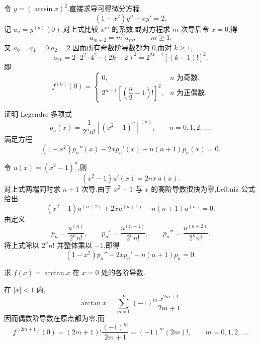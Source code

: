 \begin{solution}
    令 $y=(\arcsin x)^2$.直接求导可得微分方程
    \[
        (1-x^2)y''-xy'=2.
    \]
    记 $a_n=y^{(n)}(0)$.对上式比较 $x^m$ 的系数,或对方程求 $m$ 次导后令 $x=0$,得
    \[
        a_{m+2}=m^2a_m,
        \qquad m\geq1.
    \]
    又 $a_0=a_1=0$,$a_2=2$.因而所有奇数阶导数都为 $0$,而对 $k\geq1$,
    \[
        a_{2k}=2\cdot2^2\cdot4^2\cdots(2k-2)^2
        =2^{2k-1}[(k-1)!]^2.
    \]
    即
    \[
        f^{(n)}(0)=
        \begin{cases}
            0, & n\text{ 为奇数},  \\
            2^{n-1}\left[\left(\dfrac{n}{2}-1\right)!\right]^2,
               & n\text{ 为正偶数}.
        \end{cases}
    \]
\end{solution}

\begin{example}
    证明 Legendre 多项式
    \[
        p_n(x)=\dfrac{1}{2^n n!}\left[(x^2-1)^n\right]^{(n)},
        \qquad n=0,1,2,\ldots,
    \]
    满足方程
    \[
        (1-x^2)p_n''(x)-2xp_n'(x)+n(n+1)p_n(x)=0.
    \]
\end{example}
\exampleblank

\begin{solution}
    令 $u(x)=(x^2-1)^n$,则
    \[
        (x^2-1)u'(x)=2nx\,u(x).
    \]
    对上式两端同时求 $n+1$ 次导.由于 $x^2-1$ 与 $x$ 的高阶导数很快为零,Leibniz 公式给出
    \[
        (x^2-1)u^{(n+2)}+2x u^{(n+1)}-n(n+1)u^{(n)}=0.
    \]
    由定义
    \[
        p_n=\dfrac{u^{(n)}}{2^n n!},
        \qquad
        p_n'=\dfrac{u^{(n+1)}}{2^n n!},
        \qquad
        p_n''=\dfrac{u^{(n+2)}}{2^n n!}.
    \]
    将上式除以 $2^n n!$ 并整体乘以 $-1$,即得
    \[
        (1-x^2)p_n''-2xp_n'+n(n+1)p_n=0.
    \]
\end{solution}




\begin{example}
    求 $f(x)=\arctan x$ 在 $x=0$ 处的各阶导数.
\end{example}
\exampleblank

\begin{solution}
    在 $|x|<1$ 内,
    \[
        \arctan x
        =\sum\limits_{m=0}^{\infty}(-1)^m\dfrac{x^{2m+1}}{2m+1}.
    \]
    因而偶数阶导数在原点都为零,而
    \[
        f^{(2m+1)}(0)
        =(2m+1)!\dfrac{(-1)^m}{2m+1}
        =(-1)^m(2m)!,
        \qquad m=0,1,2,\ldots.
    \]
\end{solution}

